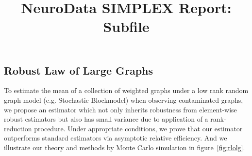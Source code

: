 \documentclass[simplex.tex]{subfiles}
\title{NeuroData SIMPLEX Report: Subfile}
\begin{document}

\subsection{Robust Law of Large Graphs}

To estimate the mean of a collection of weighted graphs under a
low rank random graph model (e.g. Stochastic Blockmodel) when
observing contaminated graphs, we propose an estimator which not
only inherits robustness from element-wise robust estimators but
also has small variance due to application of a rank-reduction
procedure. Under appropriate conditions, we prove that our
estimator outperforms standard estimators via asymptotic relative
efficiency.  And we illustrate our theory and methods by Monte
Carlo simulation in figure~\ref{fig:rlolg}.
\end{document}
